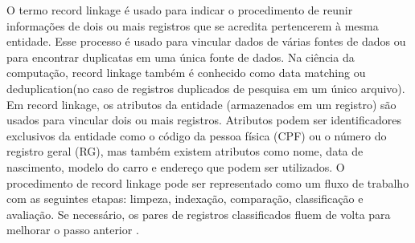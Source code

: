 O termo record linkage é usado para indicar o procedimento de reunir informações de dois ou mais registros que se acredita pertencerem à mesma entidade.
Esse processo é usado para vincular dados de várias fontes de dados ou para encontrar duplicatas em uma única fonte de dados.
Na ciência da computação, record linkage também é conhecido como data matching ou deduplication(no caso de registros duplicados de pesquisa em um único arquivo).
Em record linkage, os atributos da entidade (armazenados em um registro) são usados para vincular dois ou mais registros.
Atributos podem ser identificadores exclusivos da entidade como o código da pessoa física (CPF) ou o número do registro geral (RG), mas também existem atributos como nome, data de nascimento, modelo do carro e endereço que podem ser utilizados.
O procedimento de record linkage pode ser representado como um fluxo de trabalho com as seguintes etapas: limpeza, indexação, comparação, classificação e avaliação. Se necessário, os pares de registros classificados fluem de volta para melhorar o passo anterior \cite{christen2012data}.
